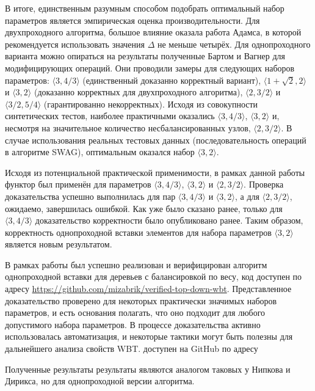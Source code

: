 \documentclass[a4paper,14pt]{extarticle}
\begin{document}
В итоге, единственным разумным способом
подобрать оптимальный набор параметров
является эмпирическая оценка производительности.
Для двухпроходного алгоритма,
большое влияние оказала работа Адамса\cite{adams},
в которой рекомендуется использовать
значения \( \Delta \) не меньше четырёх.
Для однопроходного варианта
можно опираться на результаты полученные
Бартом и Вагнер для модифицирующих операций\cite{barth}.
Они проводили замеры для следующих наборов параметров:
\( \langle 3, 4/3 \rangle \)
(единственный доказанно корректный вариант),
\( \langle 1 + \sqrt{2}, 2 \rangle \) и
\( \langle 3, 2 \rangle \)
(доказанно корректных для двухпроходного алгоритма),
\( \langle 2, 3/2 \rangle \) и
\( \langle 3/2, 5/4 \rangle \)
(гарантированно некорректных).
Исходя из совокупности синтетических тестов,
наиболее практичными
оказались \( \langle 3, 4/3 \rangle \),
\( \langle 3, 2 \rangle \)
и, несмотря на значительное количество несбалансированных узлов,
\( \langle 2, 3/2 \rangle \).
В случае использования реальных тестовых данных
(последовательность операций в алгоритме SWAG\cite{swag}),
оптимальным оказался набор \( \langle 3, 2 \rangle \).

Исходя из потенциальной практической применимости,
в рамках данной работы 
функтор  был применён
для параметров
\( \langle 3, 4/3 \rangle \), \( \langle 3, 2 \rangle \)
и \( \langle 2, 3/2 \rangle \).
Проверка доказательства успешно выполнилась
для пар \( \langle 3, 4/3 \rangle \)
и \( \langle 3, 2 \rangle \),
а для \( \langle 2, 3/2 \rangle \),
ожидаемо, завершилась ошибкой.
Как уже было сказано ранее,
только для \( \langle 3, 4/3 \rangle \) 
доказательство корректности было опубликовано ранее.
Таким образом, корректность
однопроходной вставки элементов
для набора параметров \( \langle 3, 2 \rangle \)
является новым результатом.

\clearpage
{}

В рамках работы был успешно реализован и верифицирован алгоритм однопроходной
вставки для деревьев с балансировкой по весу,
код доступен по адресу \url{https://github.com/mizabrik/verified-top-down-wbt}.
Представленное доказательство проверено для некоторых практически значимых наборов параметров,
и есть основания полагать, что оно подходит для любого допустимого набора параметров.
В процессе доказательства активно использовалась автоматизация,
и некоторые тактики могут быть полезны для дальнейшего анализа свойств WBT.
 доступен на GitHub
по адресу 

Полученные результаты результаты
являются аналогом таковых у Нипкова и Дирикса\cite{nipkow},
но для однопроходной версии алгоритма.
\end{document}
